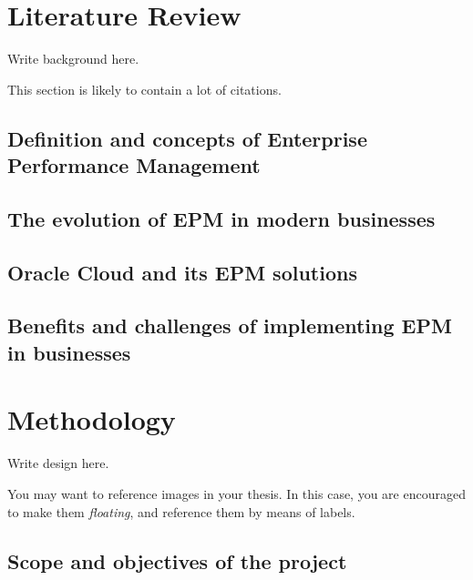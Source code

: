 \documentclass[12pt,a4paper,openright,twoside]{book}
\begin{document}
\chapter{Literature Review}
\label{chap:background}

Write background here.

This section is likely to contain a lot of citations.

\section{Definition and concepts of Enterprise Performance Management}

\section{The evolution of EPM in modern businesses}

\section{Oracle Cloud and its EPM solutions}

\section{Benefits and challenges of implementing EPM in businesses}

\chapter{Methodology}
\label{chap:design}

Write design here.


You may want to reference images in your thesis.
%
In this case, you are encouraged to make them \emph{floating}, and reference them by means of labels.

\section{Scope and objectives of the project}
\end{document}
